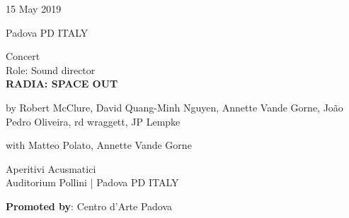 \documentclass[7pt,a4paper]{article}
\begin{document}
\begin{mdframed}[
    backgroundcolor=entrygray,
    linecolor=entrygray,
    linewidth=0pt,
    innerleftmargin=6pt,
    innerrightmargin=6pt,
    innertopmargin=6pt,
    innerbottommargin=6pt,
    skipabove=0pt,
    skipbelow=0pt
]

\begin{minipage}[t]{0.28\textwidth}

15 May 2019

\scriptsize Padova PD ITALY


\end{minipage}
\begin{minipage}[t]{0.68\textwidth}
\small Concert
\\\scriptsize Role: Sound director
\\ \normalsize \textbf{RADIA: SPACE OUT}
\par\scriptsize by Robert McClure, David Quang-Minh Nguyen, Annette Vande Gorne, João Pedro Oliveira, rd wraggett, JP Lempke
\par\scriptsize with Matteo Polato, Annette Vande Gorne
\vspace{0.25cm}



\small Aperitivi Acusmatici\\Auditorium Pollini | \scriptsize Padova PD ITALY

\vspace{0.1cm}
\scriptsize

\vspace{0.1cm}
\par \textbf{Promoted by}: Centro d'Arte Padova
\end{minipage}
\vspace{0.25cm}
\end{mdframed}
\end{document}
